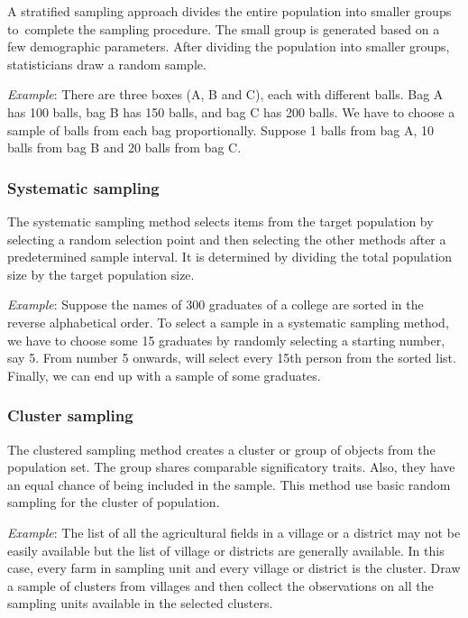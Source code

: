 \documentclass[
]{book}
\begin{document}
A stratified sampling approach divides the entire population into smaller groups to~complete the sampling procedure. The small group is generated based on a few demographic parameters. After dividing the population into smaller groups, statisticians draw a random sample.

\emph{Example}: There are three boxes (A, B and C), each with different balls. Bag A has 100 balls, bag B has 150 balls, and bag C has 200 balls. We have to choose a sample of balls from each bag proportionally. Suppose 1 balls from bag A, 10 balls from bag B and 20 balls from bag C.

\hypertarget{systematic-sampling}{%
\subsubsection{Systematic sampling}\label{systematic-sampling}}

The systematic sampling method selects items from the target population by selecting a random selection point and then selecting the other methods after a predetermined sample interval. It is determined by dividing the total population size by the target population size.

\emph{Example}: Suppose the names of 300 graduates of a college are sorted in the reverse alphabetical order. To select a sample in a systematic sampling method, we have to choose some 15 graduates by randomly selecting a starting number, say 5. From number 5 onwards, will select every 15th person from the sorted list. Finally, we can end up with a sample of some graduates.

\hypertarget{cluster-sampling}{%
\subsubsection{Cluster sampling}\label{cluster-sampling}}

The clustered sampling method creates a cluster or group of objects from the population set. The group shares comparable significatory traits. Also, they have an equal chance of being included in the sample. This method use basic random sampling for the cluster of population.

\emph{Example}: The list of all the agricultural fields in a village or a district may not be easily available but the list of village or districts are generally available. In this case, every farm in sampling unit and every
village or district is the cluster. Draw a sample of clusters from villages and then collect the observations on all the sampling units available in the selected clusters.
\end{document}
